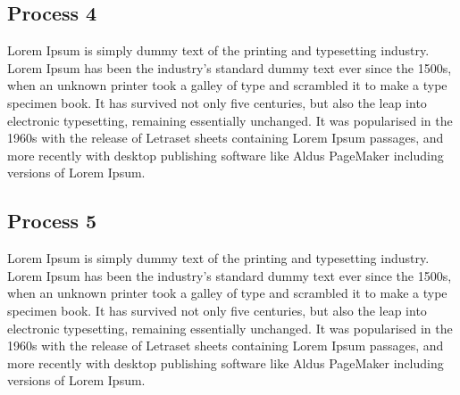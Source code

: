 \subsection{Process 4}
Lorem Ipsum\cite{DUMMY:1} is simply dummy text of the printing and typesetting industry. Lorem Ipsum has been the industry's standard dummy text ever since the 1500s, when an unknown printer took a galley of type and scrambled it to make a type specimen book. It has survived not only five centuries, but also the leap into electronic typesetting, remaining essentially unchanged. It was popularised in the 1960s with the release of Letraset sheets containing Lorem Ipsum passages, and more recently with desktop publishing software like Aldus PageMaker including versions of Lorem Ipsum.

\subsection{Process 5}
Lorem Ipsum\cite{DUMMY:1} is simply dummy text of the printing and typesetting industry. Lorem Ipsum has been the industry's standard dummy text ever since the 1500s, when an unknown printer took a galley of type and scrambled it to make a type specimen book. It has survived not only five centuries, but also the leap into electronic typesetting, remaining essentially unchanged. It was popularised in the 1960s with the release of Letraset sheets containing Lorem Ipsum passages, and more recently with desktop publishing software like Aldus PageMaker including versions of Lorem Ipsum.